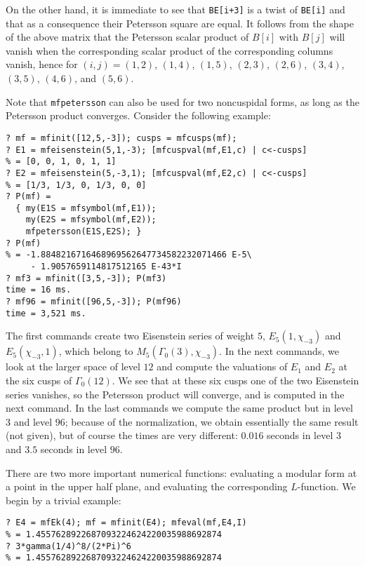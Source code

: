 \documentclass[11pt]{article}
\newcommand{\G}{\Gamma}
\def\kbd#1{{\tt #1}}
\begin{document}
On the other hand, it is immediate to see that \kbd{BE[i+3]} is a twist of
\kbd{BE[i]} and that as a consequence their Petersson square are equal. It
follows from the shape of the above matrix that the Petersson scalar product
of $B[i]$ with $B[j]$ will vanish when the corresponding scalar product of
the corresponding columns vanish, hence for $(i,j)=(1,2)$, $(1,4)$, $(1,5)$,
$(2,3)$, $(2,6)$, $(3,4)$, $(3,5)$, $(4,6)$, and $(5,6)$.

\smallskip

Note that \kbd{mfpetersson} can also be used for two noncuspidal forms, as
long as the Petersson product converges. Consider the following example:

\begin{verbatim}
? mf = mfinit([12,5,-3]); cusps = mfcusps(mf);
? E1 = mfeisenstein(5,1,-3); [mfcuspval(mf,E1,c) | c<-cusps]
% = [0, 0, 1, 0, 1, 1]
? E2 = mfeisenstein(5,-3,1); [mfcuspval(mf,E2,c) | c<-cusps]
% = [1/3, 1/3, 0, 1/3, 0, 0]
? P(mf) =
  { my(E1S = mfsymbol(mf,E1));
    my(E2S = mfsymbol(mf,E2));
    mfpetersson(E1S,E2S); }
? P(mf)
% = -1.8848216716468969562647734582232071466 E-5\
     - 1.9057659114817512165 E-43*I
? mf3 = mfinit([3,5,-3]); P(mf3)
time = 16 ms.
? mf96 = mfinit([96,5,-3]); P(mf96)
time = 3,521 ms.
\end{verbatim}

The first commands create two Eisenstein series of weight $5$,
$E_5(1,\chi_{-3})$ and $E_5(\chi_{-3},1)$, which belong to
$M_5(\G_0(3),\chi_{-3})$. In the next commands, we look at the larger space of
level $12$ and compute the valuations of $E_1$ and $E_2$ at the six cusps of
$\G_0(12)$. We see that at these six cusps one of the two Eisenstein series
vanishes, so the Petersson product will converge, and is computed in the
next command. In the last commands we compute the same product but in level
$3$ and level $96$; because of the normalization, we obtain essentially the
same result (not given), but of course the times are very different: $0.016$
seconds in level $3$ and $3.5$ seconds in level $96$.

\medskip

There are two more important numerical functions: evaluating a modular form
at a point in the upper half plane, and evaluating the corresponding
$L$-function. We begin by a trivial example:

\begin{verbatim}
? E4 = mfEk(4); mf = mfinit(E4); mfeval(mf,E4,I)
% = 1.4557628922687093224624220035988692874
? 3*gamma(1/4)^8/(2*Pi)^6
% = 1.4557628922687093224624220035988692874
\end{verbatim}
\end{document}
